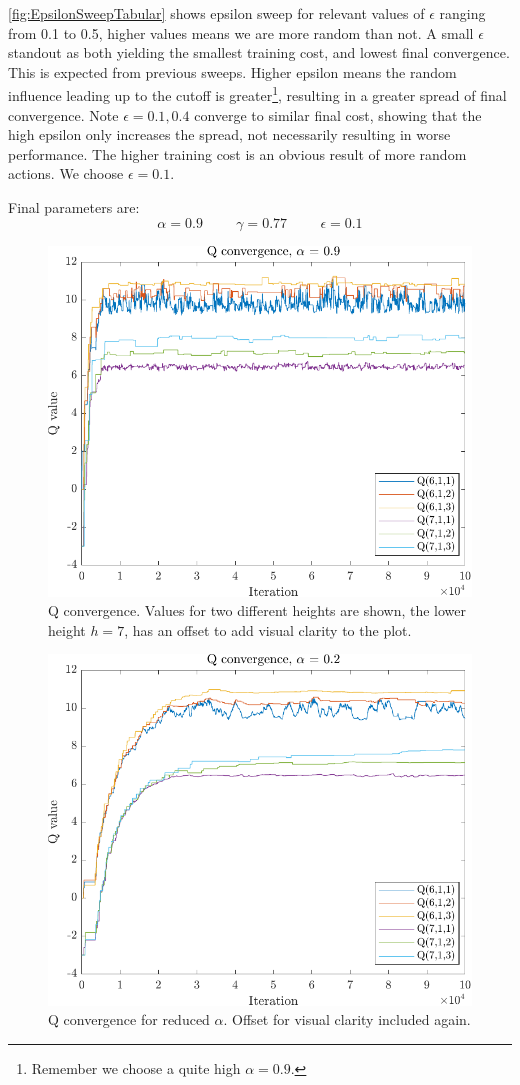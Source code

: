 \cref{fig:EpsilonSweepTabular} shows epsilon sweep for relevant values of $\epsilon$ ranging from 0.1 to 0.5, higher values means we are more random than not. A small $\epsilon$ standout as both yielding the smallest training cost, and lowest final convergence. This is expected from previous sweeps. Higher epsilon means the random influence leading up to the cutoff is greater\footnote{Remember we choose a quite high $\alpha = 0.9$.}, resulting in a greater spread of final convergence. Note $\epsilon = 0.1,0.4$ converge to similar final cost, showing that the high epsilon only increases the spread, not necessarily resulting in worse performance. The higher training cost is an obvious result of more random actions. We choose $\epsilon = 0.1$.

Final parameters are:
\begin{equation*}
	\alpha = 0.9 \hspace{1cm} \gamma = 0.77 \hspace{1cm} \epsilon = 0.1
\end{equation*}

  
\begin{figure}[h!]
	\centering
	\includegraphics[width=0.7\linewidth]{figures/QConvergence09.pdf}
	\caption{Q convergence. Values for two different heights are shown, the lower height $h=7$, has an offset to add visual clarity to the plot.}
	\label{fig:Qconvergence09}
\end{figure} 

\begin{figure}[h!]
	\centering
	\includegraphics[width=0.7\linewidth]{figures/QConvergence02.pdf}
	\caption{Q convergence for reduced $\alpha$. Offset for visual clarity included again.}
	\label{fig:Qconvergence02}
\end{figure} 

